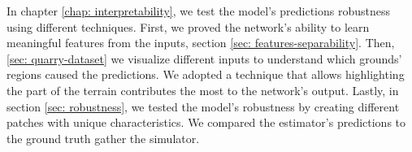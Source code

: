 \documentclass[../document.tex]{subfiles}
\begin{document}
In chapter \ref{chap: interpretability}, we test the model's predictions robustness using different techniques. First, we proved the network's ability to learn meaningful features from the inputs, section \ref{sec:  features-separability}. Then, \ref{sec: quarry-dataset} we visualize different inputs to understand which grounds' regions caused the predictions.  We adopted a technique that allows highlighting the part of the terrain contributes the most to the network's output. Lastly, in section \ref{sec: robustness}, we tested the model's robustness by creating different patches with unique characteristics. We compared the estimator's predictions to the ground truth gather the simulator.

\end{document}
